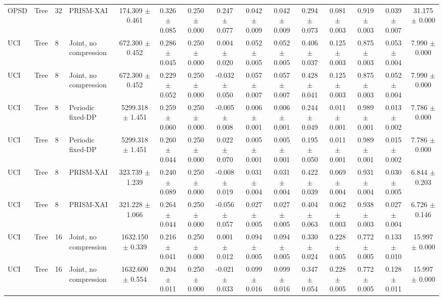 \begin{tabular}{llllccccccccccc}
OPSD & Tree & 32 & PRISM-XAI & 174.309 $\pm$ 0.461 & 0.326 $\pm$ 0.085 & 0.250 $\pm$ 0.000 & 0.247 $\pm$ 0.077 & 0.042 $\pm$ 0.009 & 0.042 $\pm$ 0.009 & 0.294 $\pm$ 0.073 & 0.081 $\pm$ 0.003 & 0.919 $\pm$ 0.003 & 0.039 $\pm$ 0.007 & 31.175 $\pm$ 0.000 \\
UCI & Tree & 8 & Joint, no compression & 672.300 $\pm$ 0.452 & 0.286 $\pm$ 0.045 & 0.250 $\pm$ 0.000 & 0.004 $\pm$ 0.020 & 0.052 $\pm$ 0.005 & 0.052 $\pm$ 0.005 & 0.406 $\pm$ 0.037 & 0.125 $\pm$ 0.003 & 0.875 $\pm$ 0.003 & 0.053 $\pm$ 0.004 & 7.990 $\pm$ 0.000 \\
UCI & Tree & 8 & Joint, no compression & 672.300 $\pm$ 0.452 & 0.229 $\pm$ 0.052 & 0.250 $\pm$ 0.000 & -0.032 $\pm$ 0.050 & 0.057 $\pm$ 0.007 & 0.057 $\pm$ 0.007 & 0.428 $\pm$ 0.041 & 0.125 $\pm$ 0.003 & 0.875 $\pm$ 0.003 & 0.052 $\pm$ 0.004 & 7.990 $\pm$ 0.000 \\
UCI & Tree & 8 & Periodic fixed-DP & 5299.318 $\pm$ 1.451 & 0.259 $\pm$ 0.060 & 0.250 $\pm$ 0.000 & -0.005 $\pm$ 0.008 & 0.006 $\pm$ 0.001 & 0.006 $\pm$ 0.001 & 0.244 $\pm$ 0.049 & 0.011 $\pm$ 0.001 & 0.989 $\pm$ 0.001 & 0.013 $\pm$ 0.002 & 7.786 $\pm$ 0.000 \\
UCI & Tree & 8 & Periodic fixed-DP & 5299.318 $\pm$ 1.451 & 0.260 $\pm$ 0.044 & 0.250 $\pm$ 0.000 & 0.022 $\pm$ 0.070 & 0.005 $\pm$ 0.001 & 0.005 $\pm$ 0.001 & 0.195 $\pm$ 0.050 & 0.011 $\pm$ 0.001 & 0.989 $\pm$ 0.001 & 0.015 $\pm$ 0.002 & 7.786 $\pm$ 0.000 \\
UCI & Tree & 8 & PRISM-XAI & 323.739 $\pm$ 1.239 & 0.240 $\pm$ 0.089 & 0.250 $\pm$ 0.000 & -0.008 $\pm$ 0.019 & 0.031 $\pm$ 0.004 & 0.031 $\pm$ 0.004 & 0.422 $\pm$ 0.039 & 0.069 $\pm$ 0.004 & 0.931 $\pm$ 0.004 & 0.030 $\pm$ 0.005 & 6.844 $\pm$ 0.203 \\
UCI & Tree & 8 & PRISM-XAI & 321.228 $\pm$ 1.066 & 0.264 $\pm$ 0.044 & 0.250 $\pm$ 0.000 & -0.056 $\pm$ 0.057 & 0.027 $\pm$ 0.005 & 0.027 $\pm$ 0.005 & 0.404 $\pm$ 0.063 & 0.062 $\pm$ 0.003 & 0.938 $\pm$ 0.003 & 0.027 $\pm$ 0.004 & 6.726 $\pm$ 0.146 \\
UCI & Tree & 16 & Joint, no compression & 1632.150 $\pm$ 0.339 & 0.216 $\pm$ 0.041 & 0.250 $\pm$ 0.000 & 0.001 $\pm$ 0.012 & 0.094 $\pm$ 0.005 & 0.094 $\pm$ 0.005 & 0.330 $\pm$ 0.024 & 0.228 $\pm$ 0.005 & 0.772 $\pm$ 0.005 & 0.133 $\pm$ 0.010 & 15.997 $\pm$ 0.000 \\
UCI & Tree & 16 & Joint, no compression & 1632.600 $\pm$ 0.554 & 0.204 $\pm$ 0.011 & 0.250 $\pm$ 0.000 & -0.021 $\pm$ 0.033 & 0.099 $\pm$ 0.016 & 0.099 $\pm$ 0.016 & 0.347 $\pm$ 0.054 & 0.228 $\pm$ 0.005 & 0.772 $\pm$ 0.005 & 0.128 $\pm$ 0.011 & 15.997 $\pm$ 0.000 \\

\end{tabular}
